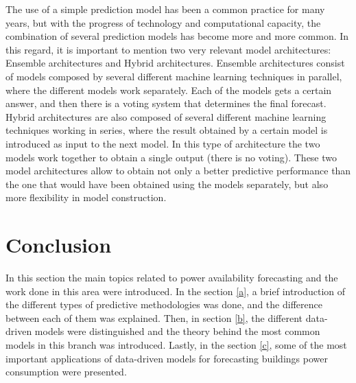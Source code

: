 The use of a simple prediction model has been a common practice for many years, but with the progress of technology and computational capacity, the combination of several prediction models has become more and more common. In this regard, it is important to mention two very relevant model architectures: Ensemble architectures and Hybrid architectures. Ensemble architectures consist of models composed by several different machine learning techniques in parallel, where the different models work separately. Each of the models gets a certain answer, and then there is a voting system that determines the final forecast. Hybrid architectures are also composed of several different machine learning techniques working in series, where the result obtained by a certain model is introduced as input to the next model. In this type of architecture the two models work together to obtain a single output (there is no voting). These two model architectures allow to obtain not only a better predictive performance than the one that would have been obtained using the models separately, but also more flexibility in model construction.


\section{Conclusion}

In this section the main topics related to power availability forecasting and the work done in this area were introduced. In the section \ref{a}, a brief introduction of the different types of predictive methodologies was done, and the difference between each of them was explained. Then, in section \ref{b}, the different data-driven models were distinguished and the theory behind the most common models in this branch was introduced. Lastly, in the section \ref{c}, some of the most important applications of data-driven models for forecasting buildings power consumption were presented.
